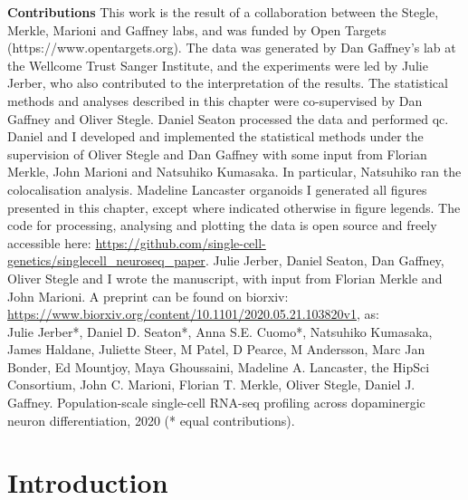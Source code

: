 \newpage

\begin{Comment2}

\hspace{-3mm}\textbf{Contributions} This work is the result of a collaboration between the Stegle, Merkle, Marioni and Gaffney labs, and was funded by Open Targets 
(https://www.opentargets.org).
The data was generated by Dan Gaffney’s lab at the Wellcome Trust Sanger Institute, and the experiments were led by Julie Jerber, who also contributed to the interpretation of the results. 
The statistical methods and analyses described in this chapter were co-supervised by Dan Gaffney and Oliver Stegle. 
Daniel Seaton processed the data and performed \gls{qc}. 
Daniel and I developed and implemented the statistical methods under the supervision of Oliver Stegle and Dan Gaffney with some input from Florian Merkle, John Marioni and Natsuhiko Kumasaka.
In particular, Natsuhiko ran the colocalisation analysis.
Madeline Lancaster organoids
I generated all figures presented in this chapter, except where indicated otherwise in figure legends. 
The code for processing, analysing and plotting the data is open source and freely accessible here: \url{https://github.com/single-cell-genetics/singlecell\_neuroseq\_paper}.
Julie Jerber, Daniel Seaton, Dan Gaffney, Oliver Stegle and I wrote the manuscript, with input from Florian Merkle and John Marioni.
A preprint \cite{jerber2020population} can be found on biorxiv: \url{https://www.biorxiv.org/content/10.1101/2020.05.21.103820v1}, as:\\

Julie Jerber*, Daniel D. Seaton*, Anna S.E. Cuomo*, Natsuhiko Kumasaka, James Haldane, Juliette Steer, M Patel, D Pearce, M Andersson, Marc Jan Bonder, Ed Mountjoy, Maya Ghoussaini, Madeline A. Lancaster, the HipSci Consortium, John C. Marioni, Florian T. Merkle, Oliver Stegle, Daniel J. Gaffney. Population-scale single-cell RNA-seq profiling across dopaminergic neuron differentiation, 2020 (* equal contributions).

\end{Comment2}

\newpage

\section{Introduction}
\label{sec:neuroseq_intro}

